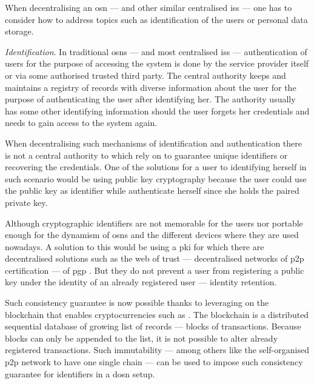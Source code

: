\documentclass[showtrims, oldfontcommands]{kthesis}
\begin{document}
When decentralising an \ac{osn} --- and other similar centralised \acp{is} --- one 
has to consider how to address topics such as identification of the users or personal 
data storage.

\textit{Identification}. In traditional \acp{osn} --- and most centralised \acp{is} 
--- authentication of users for the purpose of accessing the system is done by the 
service provider itself or via some authorised trusted third party. The central 
authority keeps and maintains a registry of records with diverse information about 
the user for the purpose of authenticating the user after identifying her. The authority 
usually has some other identifying information should the user forgets her credentials 
and needs to gain access to the system again.

When decentralising such mechanisms of identification and authentication there is 
not a central authority to which rely on to guarantee unique identifiers or recovering 
the credentials. One of the solutions for a user to identifying herself in such 
scenario would be using public key cryptography because the user could use the public 
key as identifier while authenticate herself since she holds the paired private key. 

Although cryptographic identifiers are not memorable for the users nor portable 
enough for the dynamism of \acp{osn} and the different devices where they are used 
nowadays. A solution to this would be using a \ac{pki} for which there are decentralised 
solutions such as the web of trust ---  decentralised networks of \ac{p2p} certification 
--- of \ac{pgp} \cite{Stallings95, Abdul97}. But they do not prevent a user from 
registering a public key under the identity of an already registered user --- identity 
retention. 

Such consistency guarantee is now possible thanks to leveraging on the blockchain 
that enables cryptocurrencies such as \Bitcoin \cite{Nakamoto08}. The blockchain 
is a distributed sequential database of growing list of records --- blocks of transactions. 
Because blocks can only be appended to the list, it is not possible to alter already 
registered transactions. Such immutability --- among others like the self-organised 
\ac{p2p} network to have one single chain --- can be used to impose such consistency 
guarantee for identifiers in a \ac{dosn} setup.
\end{document}
